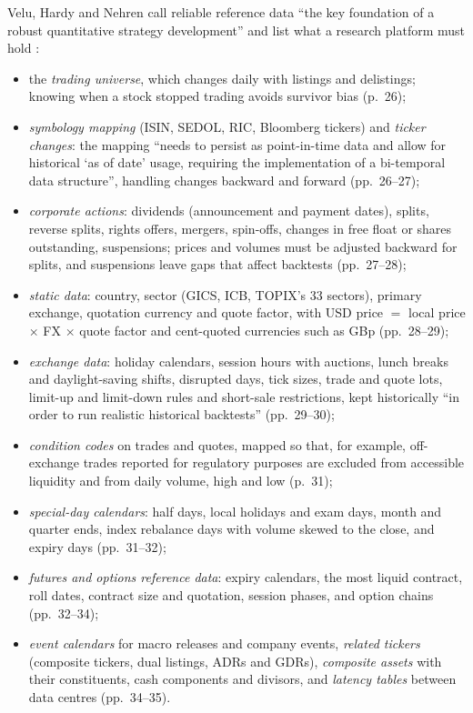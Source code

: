 \begin{qfdata}\label{data:trading-reference-data}
 Velu, Hardy and Nehren call reliable reference data ``the key foundation of a robust quantitative strategy development'' and list what a research platform must hold \citep[chap.~1, sec.~1.4.1, pp.~26--35]{s3-velu}:
\begin{itemize}\setlength{\itemsep}{0pt}
\item the \emph{trading universe}, which changes daily with listings and delistings; knowing when a stock stopped trading avoids survivor bias (p.~26);
\item \emph{symbology mapping} (ISIN, SEDOL, RIC, Bloomberg tickers) and \emph{ticker changes}: the mapping ``needs to persist as point-in-time data and allow for historical `as of date' usage, requiring the implementation of a bi-temporal data structure'', handling changes backward and forward (pp.~26--27);
\item \emph{corporate actions}: dividends (announcement and payment dates), splits, reverse splits, rights offers, mergers, spin-offs, changes in free float or shares outstanding, suspensions; prices and volumes must be adjusted backward for splits, and suspensions leave gaps that affect backtests (pp.~27--28);
\item \emph{static data}: country, sector (GICS, ICB, TOPIX's 33 sectors), primary exchange, quotation currency and quote factor, with USD price $=$ local price $\times$ FX $\times$ quote factor and cent-quoted currencies such as GBp (pp.~28--29);
\item \emph{exchange data}: holiday calendars, session hours with auctions, lunch breaks and daylight-saving shifts, disrupted days, tick sizes, trade and quote lots, limit-up and limit-down rules and short-sale restrictions, kept historically ``in order to run realistic historical backtests'' (pp.~29--30);
\item \emph{condition codes} on trades and quotes, mapped so that, for example, off-exchange trades reported for regulatory purposes are excluded from accessible liquidity and from daily volume, high and low (p.~31);
\item \emph{special-day calendars}: half days, local holidays and exam days, month and quarter ends, index rebalance days with volume skewed to the close, and expiry days (pp.~31--32);
\item \emph{futures and options reference data}: expiry calendars, the most liquid contract, roll dates, contract size and quotation, session phases, and option chains (pp.~32--34);
\item \emph{event calendars} for macro releases and company events, \emph{related tickers} (composite tickers, dual listings, ADRs and GDRs), \emph{composite assets} with their constituents, cash components and divisors, and \emph{latency tables} between data centres (pp.~34--35).
\end{itemize}


\end{qfdata}
